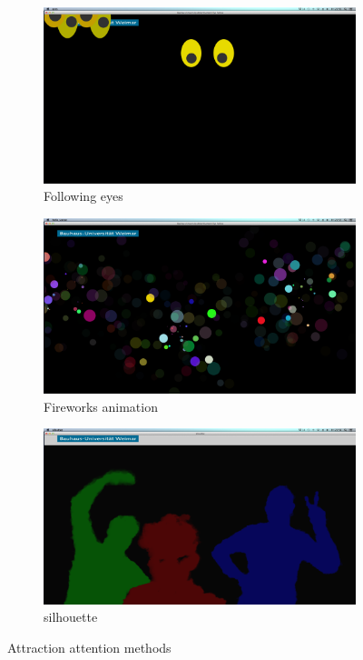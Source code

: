 \begin{figure}[H]
    \centering
    \begin{subfigure}[H]{0.3\textwidth}
        \centering
        \includegraphics[width=\textwidth]{Figures/3/eyes}
        \caption{Following eyes}
        \label{fig:Attraction_eye}
    \end{subfigure}
    \begin{subfigure}[H]{0.3\textwidth}
        \centering
        \includegraphics[width=\textwidth]{Figures/3/fireworks}
        \caption{Fireworks animation}
        \label{fig:Attraction_firework}
    \end{subfigure}
      \begin{subfigure}[H]{0.3\textwidth}
        \centering
        \includegraphics[width=\textwidth]{Figures/3/silhouttee}
        \caption{silhouette}
        \label{fig:Attraction_silhouette}
    \end{subfigure}
    \caption{Attraction attention methods }
    \label{fig:Attraction_Attention}
\end{figure}



